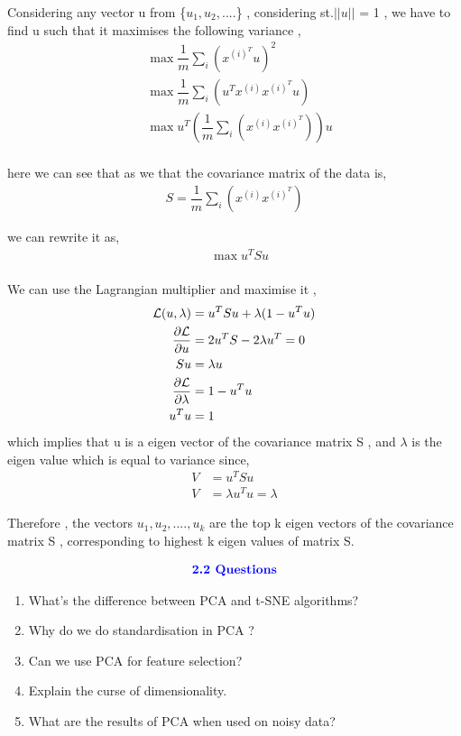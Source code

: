 \documentclass[12pt,a4paper]{article}
\begin{document}
{Considering any vector u from \{$u_1 , u_2 ,....$\} , considering st.$||u||$ = 1 , we have to find u  such that it maximises the following variance ,
\begin{align*}
    &\max \dfrac{1}{m} \sum_i (x^{(i)^T} u)^2 \\
    &\max \dfrac{1}{m} \sum_i (u^T x^{(i)}  x^{(i)^T} u) \\
    &\max u^T \left(\dfrac{1}{m} \sum_i ( x^{(i)}  x^{(i)^T} ) \right)u \\
\end{align*}

here we can see that as we that the covariance matrix of the data is,
\begin{align*}
    S = \dfrac{1}{m} \sum_i ( x^{(i)}  x^{(i)^T} ) 
\end{align*}

we can rewrite it as,
\begin{align*}
    &\max u^T S u \\
\end{align*}

We can use the Lagrangian multiplier and maximise it ,
\begin{align*}
    \mathcal{L}(u,\lambda) &= u^TSu+\lambda(1-u^Tu) \\
    {\partial \mathcal{L} \over \partial u} &= 2u^TS-2\lambda u^T = 0 \\
    S u &= \lambda u \\
    {\partial \mathcal{L} \over \partial \lambda} &= 1-u^Tu\\
    u^Tu &=1 \\
\end{align*}
which implies that u is a eigen vector of the covariance matrix S , and $\lambda$ is the eigen value which is equal to variance since,
\begin{align*}
    V &= u^T S u  \\
    V &= \lambda u^Tu = \lambda
\end{align*}

Therefore , the vectors $u_1,u_2,....,u_k$ are the top k eigen vectors of the covariance matrix S , corresponding to highest k eigen values of matrix S.


\begin{align*}
    \textcolor{blue}{\text{{\textbf{2.2 Questions}}}}
\end{align*}

\begin{enumerate}
    \item What’s the difference between PCA and t-SNE algorithms?
    \item  Why do we do standardisation in PCA ?
    \item Can we use PCA for feature selection?
    \item Explain the curse of dimensionality.
    \item What are the results of PCA when used on noisy data?\\[10pt]
\end{enumerate}





}
\end{document}
